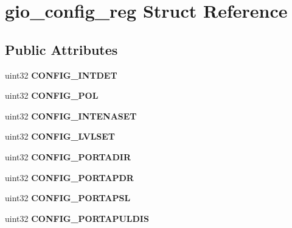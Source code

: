 \hypertarget{structgio__config__reg}{}\section{gio\+\_\+config\+\_\+reg Struct Reference}
\label{structgio__config__reg}
\subsection*{Public Attributes}
\begin{DoxyCompactItemize}
\item 
\mbox{\label{structgio__config__reg_a3ce20b3be8e84cab2aa3fbe6ad30ef6d}} 
uint32 {\bfseries C\+O\+N\+F\+I\+G\+\_\+\+I\+N\+T\+D\+ET}
\item 
\mbox{\label{structgio__config__reg_a7fab29a41a5ed98c73652d65f81dbfba}} 
uint32 {\bfseries C\+O\+N\+F\+I\+G\+\_\+\+P\+OL}
\item 
\mbox{\label{structgio__config__reg_a9f39df7e3e570a2bb2b3329e3b0c09fe}} 
uint32 {\bfseries C\+O\+N\+F\+I\+G\+\_\+\+I\+N\+T\+E\+N\+A\+S\+ET}
\item 
\mbox{\label{structgio__config__reg_a932cc8e89abb70f94528f3b711f33d30}} 
uint32 {\bfseries C\+O\+N\+F\+I\+G\+\_\+\+L\+V\+L\+S\+ET}
\item 
\mbox{\label{structgio__config__reg_a089445f8f01a74ce33f50bac7f58f47d}} 
uint32 {\bfseries C\+O\+N\+F\+I\+G\+\_\+\+P\+O\+R\+T\+A\+D\+IR}
\item 
\mbox{\label{structgio__config__reg_a1511cff416063df823da031462e81011}} 
uint32 {\bfseries C\+O\+N\+F\+I\+G\+\_\+\+P\+O\+R\+T\+A\+P\+DR}
\item 
\mbox{\label{structgio__config__reg_a02db40ed79c4bfebb6cce40ceb367a40}} 
uint32 {\bfseries C\+O\+N\+F\+I\+G\+\_\+\+P\+O\+R\+T\+A\+P\+SL}
\item 
\mbox{\label{structgio__config__reg_a6888f3ecb546d7382e2128cd4fc1695d}} 
uint32 {\bfseries C\+O\+N\+F\+I\+G\+\_\+\+P\+O\+R\+T\+A\+P\+U\+L\+D\+IS}

\end{DoxyCompactItemize}
